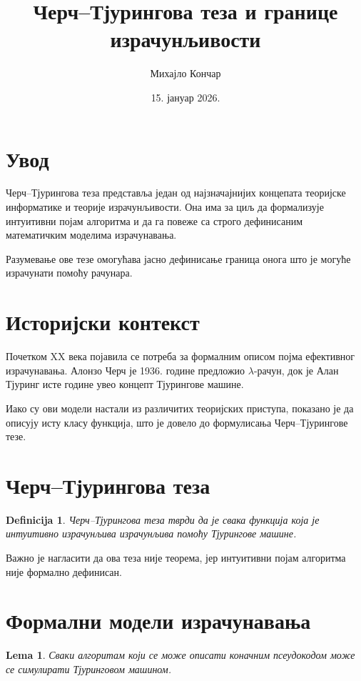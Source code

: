 \documentclass[a4paper,12pt]{article}
\title{Черч--Тјурингова теза и границе израчунљивости}
\author{Михајло Кончар}
\date{15. јануар 2026.}
\newtheorem{definicija}{Definicija}
\newtheorem{lema}{Lema}
\begin{document}
\maketitle
\tableofcontents
\newpage

\section{Увод}

Черч--Тјурингова теза представља један од најзначајнијих концепата
теоријске информатике и теорије израчунљивости. Она има за циљ да
формализује интуитивни појам алгоритма и да га повеже са строго
дефинисаним математичким моделима израчунавања.

Разумевање ове тезе омогућава јасно дефинисање граница онога што је
могуће израчунати помоћу рачунара.

\section{Историјски контекст}

Почетком XX века појавила се потреба за формалним описом појма
ефективног израчунавања. Алонзо Черч је 1936. године предложио
$\lambda$-рачун, док је Алан Тјуринг исте године увео концепт
Тјурингове машине.

Иако су ови модели настали из различитих теоријских приступа,
показано је да описују исту класу функција, што је довело до
формулисања Черч--Тјурингове тезе.

\section{Черч--Тјурингова теза}

\begin{definicija}
Черч--Тјурингова теза тврди да је свака функција која је интуитивно
израчунљива израчунљива помоћу Тјурингове машине.
\end{definicija}

Важно је нагласити да ова теза није теорема, јер интуитивни појам
алгоритма није формално дефинисан.

\section{Формални модели израчунавања}

\begin{lema}
Сваки алгоритам који се може описати коначним псеудокодом
може се симулирати Тјуринговом машином.
\end{lema}
\end{document}
